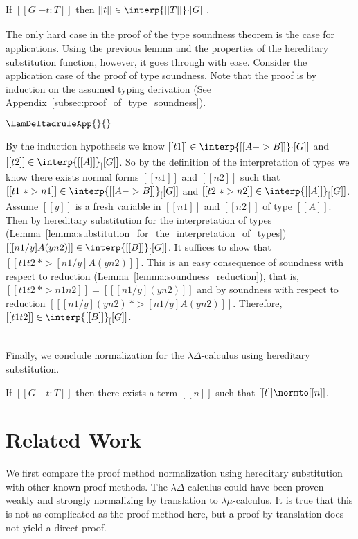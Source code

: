 \begin{thm}
  \label{theorem:type_soundness}
  If $[[G |- t : T]]$ then $[[t]] \in \interp{[[T]]}_[[G]]$.
\end{thm}
The only hard case in the proof of the type soundness theorem is the
case for applications. Using the previous lemma and the properties of
the hereditary substitution function, however, it goes through with
ease.  Consider the application case of the proof of type soundness.
Note that the proof is by induction on the assumed typing derivation (See Appendix~\ref{subsec:proof_of_type_soundness}).
\begin{center}
  \begin{math}
    \LamDeltadruleApp{}{}
  \end{math}
\end{center}
By the induction hypothesis we know $[[t1]] \in \interp{[[A -> B]]}_[[G]]$ and $[[t2]] \in \interp{[[A]]}_[[G]]$.
  So by the definition of the interpretation of types we know there exists normal forms $[[n1]]$ and $[[n2]]$
  such that $[[t1 ~*> n1]] \in \interp{[[A -> B]]}_[[G]]$ and $[[t2 ~*> n2]] \in \interp{[[A]]}_[[G]]$. Assume $[[y]]$ is a fresh
  variable in $[[n1]]$ and $[[n2]]$ of type $[[A]]$.    
  Then by hereditary 
  substitution for the interpretation of types (Lemma~\ref{lemma:substitution_for_the_interpretation_of_types}) 
  $[[ [n1/y] A (y n2)]] \in \interp{[[B]]}_[[G]]$.  
  It suffices to show that $[[t1 t2 ~*> [n1/y] A (y n2)]]$.  This is an easy consequence of soundness with respect
  to reduction (Lemma~\ref{lemma:soundness_reduction}), that is, $[[t1 t2 ~*> n1 n2]] = [[ [n1/y](y n2)]]$ 
  and by soundness with respect to reduction $[[ [n1/y](y n2) ~*> [n1/y] A (y n2)]]$.  Therefore, 
  $[[t1 t2]] \in \interp{[[B]]}_[[G]]$.  

\ \\
\noindent
Finally, we conclude normalization for the $\lambda\Delta$-calculus using hereditary substitution.
\begin{corollary}[Normalization]
  \label{corollary:normalization}
  If $[[G |- t : T]]$ then there exists a term $[[n]]$ such that $[[t]] \normto [[n]]$.
\end{corollary}

\section{Related Work}
\label{sec:related_work}
We first compare the proof method normalization using hereditary
substitution with other known proof methods.  The
$\lambda\Delta$-calculus could have been proven weakly and strongly
normalizing by translation to $\lambda\mu$-calculus.  It is true that
this is not as complicated as the proof method here, but a proof by
translation does not yield a direct proof.  

